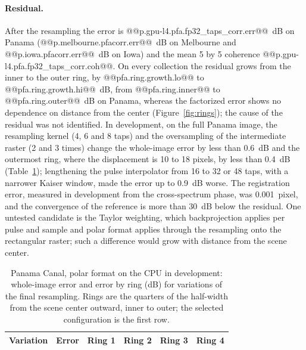 \documentclass[11pt]{article}
\begin{document}
\paragraph{Residual.} After the resampling the error is @@p.gpu-l4.pfa.fp32_taps_corr.err@@~dB on Panama (@@p.melbourne.pfacorr.err@@~dB on Melbourne and @@p.iowa.pfacorr.err@@~dB on Iowa) and the mean 5 by 5 coherence @@p.gpu-l4.pfa.fp32_taps_corr.coh@@. On every collection the residual grows from the inner to the outer ring, by @@pfa.ring.growth.lo@@ to @@pfa.ring.growth.hi@@~dB, from @@pfa.ring.inner@@ to @@pfa.ring.outer@@~dB on Panama, whereas the factorized error shows no dependence on distance from the center (Figure~\ref{fig:rings}); the cause of the residual was not identified. In development, on the full Panama image, the resampling kernel (4, 6 and 8 taps) and the oversampling of the intermediate raster (2 and 3 times) change the whole-image error by less than 0.6~dB and the outermost ring, where the displacement is 10 to 18 pixels, by less than 0.4~dB (Table~\ref{tab:pfaedge}); lengthening the pulse interpolator from 16 to 32 or 48 taps, with a narrower Kaiser window, made the error up to 0.9~dB worse. The registration error, measured in development from the cross-spectrum phase, was 0.001~pixel, and the convergence of the reference is more than 30~dB below the residual. One untested candidate is the Taylor weighting, which backprojection applies per pulse and sample and polar format applies through the resampling onto the rectangular raster; such a difference would grow with distance from the scene center.

\begin{table}[tb]
\centering
\caption{Panama Canal, polar format on the CPU in development: whole-image error and error by ring (dB) for variations of the final resampling. Rings are the quarters of the half-width from the scene center outward, inner to outer; the selected configuration is the first row.}
\label{tab:pfaedge}
\small
\begin{tabular}{lrrrrr}
\toprule
Variation & Error & Ring 1 & Ring 2 & Ring 3 & Ring 4 \\
\midrule
\bottomrule
\end{tabular}
\end{table}
\end{document}
